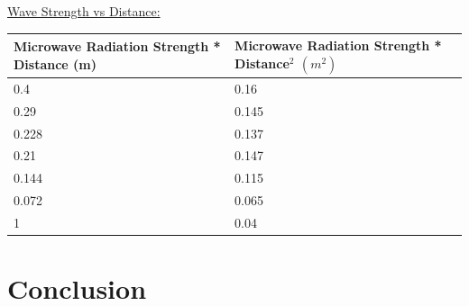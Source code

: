 \documentclass[11pt, titlepage]{article}
\begin{document}
\underline{Wave Strength vs Distance:}
\begin{center}
\begin{tabular}
{|m{15em}|m{15em}|}
\hline
Microwave Radiation Strength * Distance (m) & Microwave Radiation Strength * Distance$^2$ $(m^2)$ \\
\hline
0.4 & 0.16\\
\hline
0.29 & 0.145\\
\hline
0.228 & 0.137\\
\hline
0.21 & 0.147\\
\hline
0.144 & 0.115\\
\hline
0.072 & 0.065\\
\hline
1 & 0.04\\
\hline
\end{tabular}
\end{center}



\section*{Conclusion}
\end{document}
